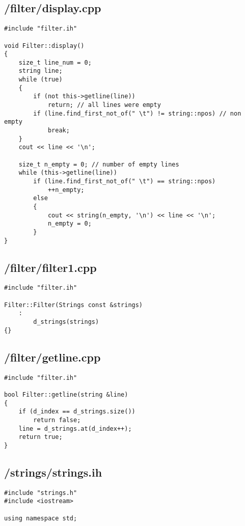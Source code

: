 \documentclass{article}
\begin{document}
\subsection*{/filter/display.cpp}
\begin{verbatim}
#include "filter.ih"

void Filter::display()
{
    size_t line_num = 0;
    string line;
    while (true)
    {
        if (not this->getline(line))
            return; // all lines were empty
        if (line.find_first_not_of(" \t") != string::npos) // non empty
            break;
    }
    cout << line << '\n';

    size_t n_empty = 0; // number of empty lines
    while (this->getline(line))
        if (line.find_first_not_of(" \t") == string::npos)
            ++n_empty;
        else
        {
            cout << string(n_empty, '\n') << line << '\n';
            n_empty = 0;
        }
}

\end{verbatim}
\subsection*{/filter/filter1.cpp}
\begin{verbatim}
#include "filter.ih"

Filter::Filter(Strings const &strings)
    :
        d_strings(strings)
{}

\end{verbatim}
\subsection*{/filter/getline.cpp}
\begin{verbatim}
#include "filter.ih"

bool Filter::getline(string &line)
{
    if (d_index == d_strings.size())
        return false;
    line = d_strings.at(d_index++);
    return true;
}
\end{verbatim}

\subsection*{/strings/strings.ih}
\begin{verbatim}
#include "strings.h"
#include <iostream>

using namespace std;

\end{verbatim}
\end{document}
